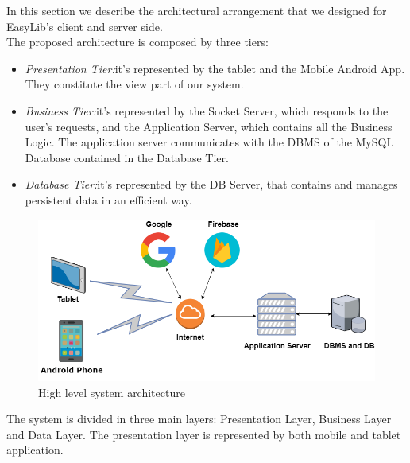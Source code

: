 \vspace*{-5mm}

In this section we describe the architectural arrangement that we designed for EasyLib’s client and server side.\\

The proposed architecture is composed by three tiers:

\begin{itemize}
\item \emph{Presentation Tier:}it’s represented by the tablet and the Mobile Android App. They constitute the view part of our system.
\item \emph{Business Tier:}it’s represented by the Socket Server, which responds to the user’s requests, and the Application Server, which contains all the Business Logic. The application server communicates with the DBMS of the MySQL Database contained in the Database Tier.
\item \emph{Database Tier:}it’s represented by the DB Server, that contains and manages persistent data in an efficient way.
\end{itemize}

\vspace*{0cm}
\begin{figure}[H]
	\centering
	\includegraphics[scale=0.5]{Images/Diagrams/High_level_System_Architecture}
	\caption{High level system architecture}
\end{figure}

\newpage
{}
The system is divided in three main layers: Presentation Layer, Business Layer and Data Layer. The presentation layer is represented by both mobile and tablet application.

